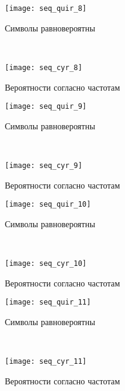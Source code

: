 \begin{figure}[H]
\begin{center}
	\begin{subfigure}[b]{0.45\textwidth}
		\texttt{[image: seq\_quir\_8]}
		\caption{Символы равновероятны}
	\end{subfigure}
	~
	\begin{subfigure}[b]{0.45\textwidth}
		\texttt{[image: seq\_cyr\_8]}
		\caption{Вероятности согласно частотам}
	\end{subfigure}
	\caption{}
\end{center}
\end{figure}

\begin{figure}[H]
\begin{center}
	\begin{subfigure}[b]{0.45\textwidth}
		\texttt{[image: seq\_quir\_9]}
		\caption{Символы равновероятны}
	\end{subfigure}
	~
	\begin{subfigure}[b]{0.45\textwidth}
		\texttt{[image: seq\_cyr\_9]}
		\caption{Вероятности согласно частотам}
	\end{subfigure}
	\caption{}
\end{center}
\end{figure}

\begin{figure}[H]
\begin{center}
	\begin{subfigure}[b]{0.45\textwidth}
		\texttt{[image: seq\_quir\_10]}
		\caption{Символы равновероятны}
	\end{subfigure}
	~
	\begin{subfigure}[b]{0.45\textwidth}
		\texttt{[image: seq\_cyr\_10]}
		\caption{Вероятности согласно частотам}
	\end{subfigure}
	\caption{}
\end{center}
\end{figure}

\begin{figure}[H]
\begin{center}
	\begin{subfigure}[b]{0.45\textwidth}
		\texttt{[image: seq\_quir\_11]}
		\caption{Символы равновероятны}
	\end{subfigure}
	~
	\begin{subfigure}[b]{0.45\textwidth}
		\texttt{[image: seq\_cyr\_11]}
		\caption{Вероятности согласно частотам}
	\end{subfigure}
	\caption{}
\end{center}
\end{figure}

